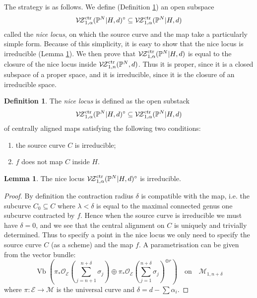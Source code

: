 \documentclass[11pt]{amsart}
\newcommand{\PP}{\mathbb P}
\newcommand{\VZc}[4]{\mathcal{V\!Z}^{\rm{ctr}}_{#1,#2}(#3,#4)}
\newcommand{\OO}{\mathcal{O}}
\renewcommand{\to}{\rightarrow}
\theoremstyle{definition}
\newtheorem{lem}[thm]{Lemma}
\theoremstyle{definition}
\newtheorem{definition}[thm]{Definition}
\begin{document}
The strategy is as follows. We define (Definition \ref{Definition of nice locus}) an open subspace
\begin{equation*}\VZc{1}{\alpha}{\PP^N|H}{d}^{\circ} \subseteq \VZc{1}{\alpha}{\PP^N|H}{d}\end{equation*}
called the \emph{nice locus}, on which the source curve and the map take a particularly simple form. Because of this simplicity, it is easy to show that the nice locus is irreducible (Lemma \ref{Nice locus is irreducible}). We then prove that $\VZc{1}{\alpha}{\PP^N|H}{d}$ is equal to the closure of the nice locus inside $\VZc{1}{n}{\PP^N}{d}$. Thus it is proper, since it is a closed subspace of a proper space, and it is irreducible, since it is the closure of an irreducible space.

\begin{definition} \label{Definition of nice locus} The \emph{nice locus} is defined as the open substack
\begin{equation*}\VZc{1}{\alpha}{\PP^N|H}{d}^{\circ} \subseteq \VZc{1}{\alpha}{\PP^N|H}{d}\end{equation*}
of centrally aligned maps satisfying the following two conditions:
\begin{enumerate}
\item the source curve $C$ is irreducible;
\item $f$ does not map $C$ inside $H$.
\end{enumerate}
\end{definition}

\begin{lem}\label{Nice locus is irreducible}
The nice locus $\VZc{1}{\alpha}{\PP^N|H}{d}^{\circ}$ is irreducible.
\end{lem}
\begin{proof}
By definition the contraction radius $\delta$ is compatible with the map, i.e. the subcurve $C_0\subseteq C$ where $\lambda<\delta$ is equal to the maximal connected genus one subcurve contracted by $f$. Hence when the source curve is irreducible we must have $\delta=0$, and we see that the central alignment on $C$ is uniquely and trivially determined. Thus to specify a point in the nice locus we only need to specify the source curve $C$ (as a scheme) and the map $f$. A parametrisation can be given from the vector bundle:
\[ \operatorname{Vb}\left(\pi_*\OO_{\mathcal E}(\sum_{j=n+1}^{n+\delta}\sigma_j)\oplus\pi_*\OO_{\mathcal E}(\sum_{j=1}^{n+\delta}\sigma_j)^{\oplus r}\right) \quad \text{on} \quad \mathcal{M}_{1,n+\delta}\]
where $\pi\colon\mathcal E\to\mathcal M$ is the universal curve and $\delta=d-\sum\alpha_i$.
\end{proof}
\end{document}
